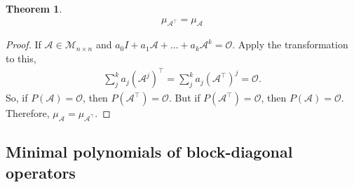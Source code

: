 \documentclass{article}
\theoremstyle{definition}
\newtheorem{thm}{Theorem}[section]
\newcommand{\A}{\mathcal{A}}
\newcommand{\M}{\mathcal{M}}
\begin{document}
\begin{thm}
	\begin{align*}
	\boxed{\mu_{\A^\top} = \mu_\A}
	\end{align*}
	
	\begin{proof}
		If $\A\in \M_{n\times n}$ and $a_0 I + a_1 \A + \dots + a_k \A^k = \mathcal{O}$. Apply the transformation to this,
		\begin{align*}
		\sum^k_j a_j (\A^j)^\top = \sum^k_j a_j (\A^\top)^j = \mathcal{O}.
		\end{align*}
		So, if $P(\A) = \mathcal{O}$, then $P(\A^\top) = \mathcal{O}$. But if $P(\A^\top) = \mathcal{O}$, then $P(\A) = \mathcal{O}$. Therefore, $\mu_\A = \mu_{\A^\top}$.  
	\end{proof}
\end{thm}


\subsection{Minimal polynomials of block-diagonal operators}
\end{document}
